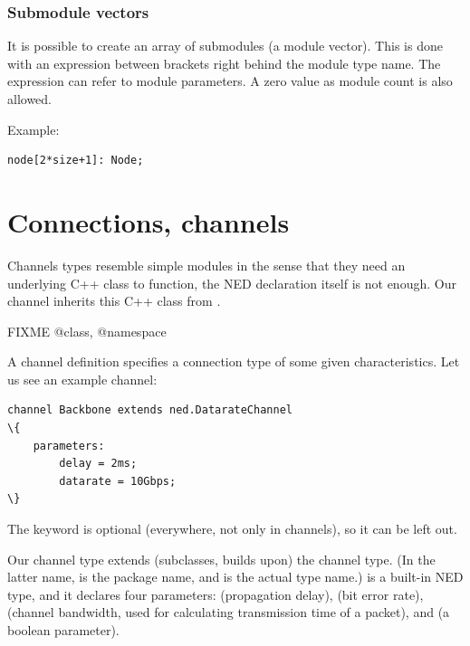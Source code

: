 \subsubsection{Submodule vectors}

It is possible to create an array of
submodules (a module
vector).  This is done with an expression between
brackets right behind the module type name. The expression can refer
to module parameters. A zero value as module count is also allowed.

Example:

\begin{Verbatim}[commandchars=\\\{\}]
    node[2*size+1]: Node;
\end{Verbatim}


\section{Connections, channels}

Channels types resemble simple modules in the sense that they need an underlying
C++ class to function, the NED declaration itself is not enough. Our
 channel inherits this C++ class from .

FIXME @class, @namespace

A channel definition specifies a connection type of some given characteristics.
Let us see an example channel:

\begin{Verbatim}[commandchars=\\\{\}]
channel Backbone extends ned.DatarateChannel
\{
    parameters:
        delay = 2ms;
        datarate = 10Gbps;
\}
\end{Verbatim}

\begin{note}
    The  keyword is optional (everywhere, not only in
    channels), so it can be left out.
\end{note}

Our  channel type extends (subclasses, builds upon) the
 channel type. (In the latter name,  is the
package name, and  is the actual type name.)
 is a built-in NED type, and it declares four parameters:
 (propagation delay),  (bit error rate), 
(channel bandwidth, used for calculating transmission time of a packet), and
 (a boolean parameter).

